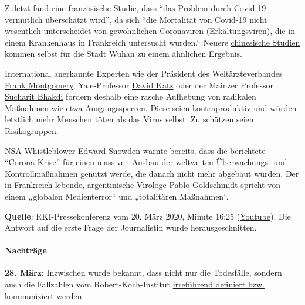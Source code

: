Zuletzt fand eine
\href{https://www.sciencedirect.com/science/article/abs/pii/S0924857920300972}{französische
Studie}, dass ``das Problem durch Covid-19 vermutlich überschätzt
wird'', da sich ``die Mortalität von Covid-19 nicht wesentlich
unterscheidet von gewöhnlichen Coronaviren (Erkältungsviren), die in
einem Krankenhaus in Frankreich untersucht wurden.`` Neuere
\href{https://www.medrxiv.org/content/10.1101/2020.02.12.20022434v2}{chinesische
Studien} kommen selbst für die Stadt Wuhan zu einem ähnlichen Ergebnis.

International anerkannte Experten wie der Präsident des
Weltärzteverbandes
\href{https://www.general-anzeiger-bonn.de/news/politik/deutschland/interview-mit-weltaerztepraesident-montgomery-ueber-corona-pandemie-ist-chaos_aid-49609561}{Frank
Montgomery}, Yale-Professor
\href{https://www.nytimes.com/2020/03/20/opinion/coronavirus-pandemic-social-distancing.html}{David
Katz} oder der Mainzer Professor
\href{https://www.youtube.com/watch?v=JBB9bA-gXL4}{Sucharit Bhakdi}
fordern deshalb eine rasche Aufhebung von radikalen Maßnahmen wie etwa
Ausgangssperren. Diese seien kontraproduktiv und würden letztlich mehr
Menschen töten als das Virus selbst. Zu schützen seien Risikogruppen.

NSA-Whistleblower Edward Snowden
\href{https://www.youtube.com/watch?v=-pcQFTzck_c}{warnte bereits}, dass
die berichtete ``Corona-Krise'' für einen massiven Ausbau der weltweiten
Überwachungs- und Kontrollmaßnahmen genutzt werde, die danach nicht mehr
abgebaut würden. Der in Frankreich lebende, argentinische Virologe Pablo
Goldschmidt
\href{https://www.infobae.com/coronavirus/2020/03/28/para-un-prestigioso-cientifico-argentino-el-coronavirus-no-merece-que-el-planeta-este-en-un-estado-de-parate-total/}{spricht
von} einem „globalen Medienterror`` und „totalitären Maßnahmen``.

\textbf{Quelle}: RKI-Pressekonferenz vom 20. März 2020, Minute 16:25
(\href{https://youtu.be/tI5SnAirYLw?t=985}{Youtube}). Die Antwort auf
die erste Frage der Journalistin wurde herausgeschnitten.

\hypertarget{nachtruxe4ge}{%
\paragraph{Nachträge}\label{nachtruxe4ge}}

\textbf{28. März}: Inzwischen wurde bekannt, dass nicht nur die
Todesfälle, sondern auch die Fallzahlen vom Robert-Koch-Institut
\href{https://multipolar-magazin.de/artikel/coronavirus-irrefuhrung-fallzahlen}{irreführend
definiert bzw. kommuniziert werden}.

